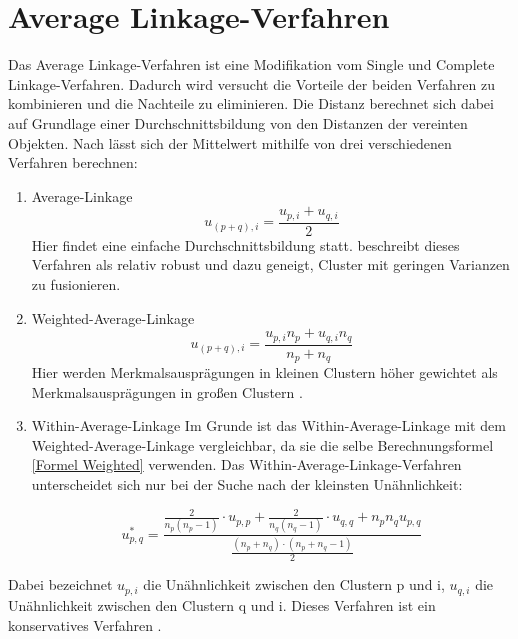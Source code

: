 \section{Average Linkage-Verfahren}
Das Average Linkage-Verfahren ist eine Modifikation vom Single und Complete Linkage-Verfahren. Dadurch wird versucht die Vorteile der beiden Verfahren zu kombinieren und die Nachteile zu eliminieren. Die Distanz berechnet sich dabei auf Grundlage einer Durchschnittsbildung von den Distanzen der vereinten Objekten.
Nach \citet[S. 264]{Bacher.2010} lässt sich der Mittelwert mithilfe von drei verschiedenen Verfahren berechnen:
\begin{enumerate}
	\item Average-Linkage
	\begin{equation}
		u_{(p+q),i} = \frac{u_{p,i} + u_{q,i}}{2}
	\end{equation}
	Hier findet eine einfache Durchschnittsbildung statt. \citet[S. 79]{Everitt.2011} beschreibt dieses Verfahren als relativ robust und dazu geneigt, Cluster mit geringen Varianzen zu fusionieren.
	\item Weighted-Average-Linkage
	\begin{equation}
		u_{(p+q),i} = \frac{u_{p,i}n_{p} + u_{q,i}n_{q}}{n_{p} + n_{q}}
		\label{Formel Weighted}
	\end{equation}
	Hier werden Merkmalsausprägungen in kleinen Clustern höher gewichtet als Merkmalsausprägungen in großen Clustern \citep[Vgl.][S. 79]{Everitt.2011}.
	\item Within-Average-Linkage 
	Im Grunde ist das Within-Average-Linkage mit dem Weighted-Average-Linkage vergleichbar, da sie die selbe Berechnungsformel \ref{Formel Weighted} verwenden. Das Within-Average-Linkage-Verfahren unterscheidet sich nur bei der Suche nach der kleinsten Unähnlichkeit: 
	
	\begin{equation}
	u_{p,q}^* = \frac{
					\frac{2}{n_p(n_p-1)}
					\cdot u_{p,p}+
					\frac{2}{n_q(n_q-1)}
					\cdot u_{q,q}+n_pn_qu_{p,q}
				}
				{
				\frac{(n_p+n_q)\cdot(n_p+n_q-1)}{2}
				}
	\end{equation}

\end{enumerate}
Dabei bezeichnet $u_{p,i}$ die Unähnlichkeit zwischen den Clustern p und i, $u_{q,i}$ die Unähnlichkeit zwischen den Clustern q und i.
Dieses Verfahren ist ein konservatives Verfahren \citep[Vgl.][S. 264-266]{Bacher.2010}. 

